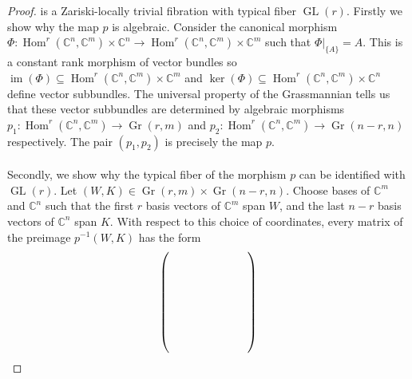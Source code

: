 \documentclass{amsart}
\theoremstyle{plain}
\numberwithin{equation}{section}
\theoremstyle{definition}
\theoremstyle{remark}
\begin{document}
\begin{proof}
		is a Zariski-locally trivial fibration with typical fiber $\operatorname{GL}(r)$. Firstly we show why the map $p$ is algebraic. Consider the canonical morphism $\Phi:\operatorname{Hom}^r(\mathbb{C}^n,\mathbb{C}^m)\times \mathbb{C}^n\to \operatorname{Hom}^r(\mathbb{C}^n,\mathbb{C}^m)\times \mathbb{C}^m$ such that $\Phi|_{\{A\}}=A$. This is a constant rank morphism of vector bundles so $\operatorname{im}(\Phi)\subseteq\operatorname{Hom}^r(\mathbb{C}^n,\mathbb{C}^m)\times\mathbb{C}^m$ and $\ker(\Phi)\subseteq \operatorname{Hom}^r(\mathbb{C}^n,\mathbb{C}^m)\times \mathbb{C}^n$ define vector subbundles. The universal property of the Grassmannian tells us that these vector subbundles are determined by algebraic morphisms $p_1:\operatorname{Hom}^r(\mathbb{C}^n,\mathbb{C}^m)\to\operatorname{Gr}(r,m)$ and $p_2:\operatorname{Hom}^r(\mathbb{C}^n,\mathbb{C}^m)\to \operatorname{Gr}(n-r,n)$ respectively. The pair $(p_1,p_2)$ is precisely the map $p$. 
		\\
		\\
		Secondly, we show why the typical fiber of the morphism $p$ can be identified with $\operatorname{GL}(r)$. Let $(W,K)\in \operatorname{Gr}(r,m)\times \operatorname{Gr}(n-r,n)$. Choose bases of $\mathbb C^m$ and $\mathbb C^n$ such that the first $r$ basis vectors of $\mathbb C^m$ span $W$, and the last $n-r$ basis
		vectors of $\mathbb C^n$ span $K$. With respect to this choice of coordinates, every matrix of the preimage $p^{-1}(W,K)$ has the form
		\begin{equation}\label{fibresOfMapSendingRankRToItsImageAndKernel}
			\begin{tikzpicture}[baseline=(M.center),scale=0.5,row sep=small,column sep=small]
				\matrix (M) [
				matrix of math nodes,
				left delimiter=(,
				right delimiter=),
				nodes={
					minimum width=1.2em,
					minimum height=1.65em,
					inner sep=0pt,
					anchor=center
				},
				column sep=0pt,
				row sep=0pt
				] {
					\vphantom{0} & \vphantom{0} & \vphantom{0} & \vphantom{0} & \vphantom{0} \\
					\vphantom{0} & \vphantom{0} & \vphantom{0} & \vphantom{0} & \vphantom{0} \\
					\vphantom{0} & \vphantom{0} & \vphantom{0} & \vphantom{0} & \vphantom{0} \\
					\vphantom{0} & \vphantom{0} & \vphantom{0} & \vphantom{0} & \vphantom{0} \\
					\vphantom{0} & \vphantom{0} & \vphantom{0} & \vphantom{0} & \vphantom{0} \\
				};
				

\end{tikzpicture}
\end{equation}
\end{proof}
\end{document}
